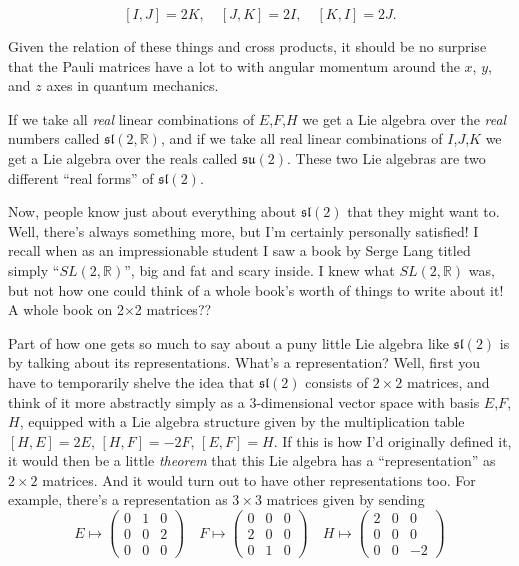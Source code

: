 \documentclass{article}
\begin{document}
\[[I,J] = 2K, \quad [J,K] = 2I, \quad [K,I] = 2J.\]

Given the relation of these things and cross products, it should be no
surprise that the Pauli matrices have a lot to with angular momentum
around the \(x\), \(y\), and \(z\) axes in quantum mechanics.

If we take all \emph{real} linear combinations of \(E\),\(F\),\(H\) we
get a Lie algebra over the \emph{real} numbers called
\(\mathfrak{sl}(2,\mathbb{R})\), and if we take all real linear
combinations of \(I\),\(J\),\(K\) we get a Lie algebra over the reals
called \(\mathfrak{su}(2)\). These two Lie algebras are two different
``real forms'' of \(\mathfrak{sl}(2)\).

Now, people know just about everything about \(\mathfrak{sl}(2)\) that
they might want to. Well, there's always something more, but I'm
certainly personally satisfied! I recall when as an impressionable
student I saw a book by Serge Lang titled simply
``\(SL(2,\mathbb{R})\)'', big and fat and scary inside. I knew what
\(SL(2,\mathbb{R})\) was, but not how one could think of a whole book's
worth of things to write about it! A whole book on 2×2 matrices??

Part of how one gets so much to say about a puny little Lie algebra like
\(\mathfrak{sl}(2)\) is by talking about its representations. What's a
representation? Well, first you have to temporarily shelve the idea that
\(\mathfrak{sl}(2)\) consists of \(2\times2\) matrices, and think of it
more abstractly simply as a 3-dimensional vector space with basis
\(E\),\(F\),\(H\), equipped with a Lie algebra structure given by the
multiplication table \([H,E] = 2E\), \([H,F] = -2F\), \([E,F] = H\). If
this is how I'd originally defined it, it would then be a little
\emph{theorem} that this Lie algebra has a ``representation'' as
\(2\times2\) matrices. And it would turn out to have other
representations too. For example, there's a representation as
\(3\times3\) matrices given by sending
\[E\mapsto\left(\begin{array}{ccc}0&1&0\\0&0&2\\0&0&0\end{array}\right) \quad F\mapsto\left(\begin{array}{ccc}0&0&0\\2&0&0\\0&1&0\end{array}\right) \quad H\mapsto\left(\begin{array}{ccc}2&0&0\\0&0&0\\0&0&-2\end{array}\right)\]
\end{document}
